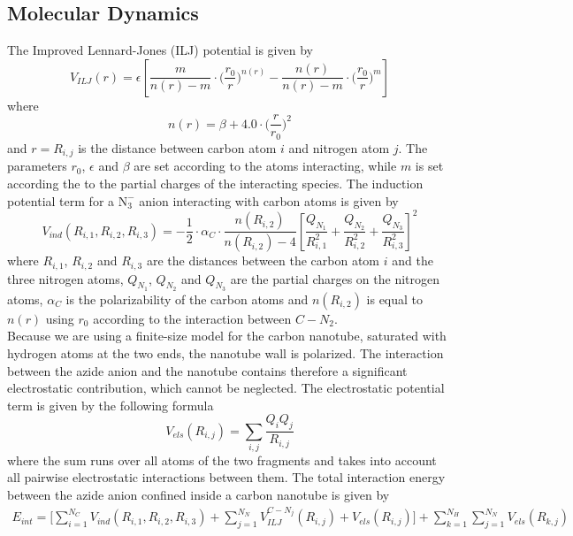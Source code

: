 \documentclass[utf8]{article}
\begin{document}
\subsection{Molecular Dynamics}
The Improved Lennard-Jones (ILJ) potential is given by
%
\begin{equation}
    V_{ILJ}(r) = \epsilon \left[ \frac{m}{n(r)-m} \cdot \Big( \frac{r_0}{r} \Big)^{n(r)} -
                                 \frac{n(r)}{n(r)-m} \cdot \Big( \frac{r_0}{r} \Big)^{m} \right]
\end{equation}
%
where
%
\begin{equation}
    n(r) = \beta + 4.0 \cdot \Big( \frac{r}{r_0} \Big)^2
\end{equation}
%
and $r = R_{i,j}$ is the distance between carbon atom $i$ and nitrogen atom $j$. The parameters $r_0$, $\epsilon$ and $\beta$ are set according to the atoms interacting, while $m$ is set according the to the partial charges of the interacting species.
The induction potential term for a $\text{N}_3^-$ anion interacting with carbon atoms is given by
%
\begin{equation}
    V_{ind}(R_{i,1},R_{i,2},R_{i,3}) = - \frac{1}{2} \cdot \alpha_C \cdot \frac{n(R_{i,2})}{n(R_{i,2}) - 4}
                        \left[ \frac{Q_{N_1}}{R_{i,1}^2} + \frac{Q_{N_2}}{R_{i,2}^2} + \frac{Q_{N_3}}{R_{i,3}^2} \right]^2
\end{equation}
%
where $R_{i,1}$, $R_{i,2}$ and $R_{i,3}$ are the distances between the carbon atom $i$ and the three nitrogen atoms, $Q_{N_1}$, $Q_{N_2}$ and $Q_{N_3}$ are the partial charges on the nitrogen atoms, $\alpha_C$ is the polarizability of the carbon atoms and $n(R_{i,2})$ is equal to $n(r)$ using $r_0$ according to the interaction between $C-N_2$.\\
Because we are using a finite-size model for the carbon nanotube, saturated with hydrogen atoms at the two ends, the nanotube wall is polarized.
The interaction between the azide anion and the nanotube contains therefore a significant electrostatic contribution, which cannot be neglected.
The electrostatic potential term is given by the following formula
%
\begin{equation}
    V_{els}(R_{i,j}) = \sum_{i,j} \frac{Q_i Q_j}{R_{i,j}}
\end{equation}
%
where the sum runs over all atoms of the two fragments and takes into account all pairwise electrostatic interactions between them.
The total interaction energy between the azide anion confined inside a carbon nanotube is given by
%
\begin{align}
    E_{int} = \Bigg[ \sum_{i=1}^{N_C} V_{ind}(R_{i,1},R_{i,2},R_{i,3}) +
              \sum_{j=1}^{N_N} V_{ILJ}^{C-N_{j}}(R_{i,j}) + V_{els}(R_{i,j}) \Bigg] +
              \sum_{k=1}^{N_H} \sum_{j=1}^{N_N} V_{els}(R_{k,j})
\end{align}
\end{document}
